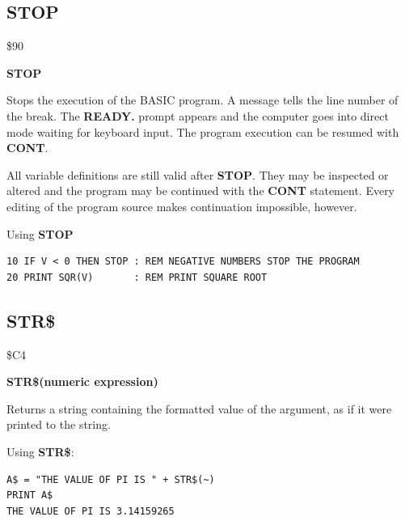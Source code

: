 
\newpage
\subsection{STOP}
\begin{description}[leftmargin=2cm,style=nextline]
\item [Token:] \$90
\item [Format:] {\bf STOP}
\item [Usage:] Stops the execution
               of the BASIC program.
               A message tells the line number of the break.
               The {\bf READY.} prompt
               appears and the computer goes into direct mode
               waiting for keyboard input.
               The program execution can be resumed with {\bf CONT}.

\item [Remarks:]
               All variable definitions are still valid after {\bf STOP}.
               They may be inspected or altered and the
               program may be continued with the {\bf CONT}
               statement. Every editing of the program source
               makes continuation impossible, however.

\item [Example:] Using {\bf STOP}
\begin{tcolorbox}[colback=black,coltext=white]
\verbatimfont{\codefont}
\begin{verbatim}
10 IF V < 0 THEN STOP : REM NEGATIVE NUMBERS STOP THE PROGRAM
20 PRINT SQR(V)       : REM PRINT SQUARE ROOT
\end{verbatim}
\end{tcolorbox}
\end{description}


\newpage
\subsection{STR\$}
\begin{description}[leftmargin=2cm,style=nextline]
\item [Token:] \$C4
\item [Format:] {\bf STR\$(numeric expression)}
\item [Usage:] Returns a string
               containing the formatted value of the argument,
               as if it were printed to the string.

\item [Example:] Using {\bf STR\$}:
\begin{tcolorbox}[colback=black,coltext=white]
\verbatimfont{\codefont}
\begin{verbatim}
A$ = "THE VALUE OF PI IS " + STR$(~)
PRINT A$
THE VALUE OF PI IS 3.14159265
\end{verbatim}
\end{tcolorbox}
\end{description}

